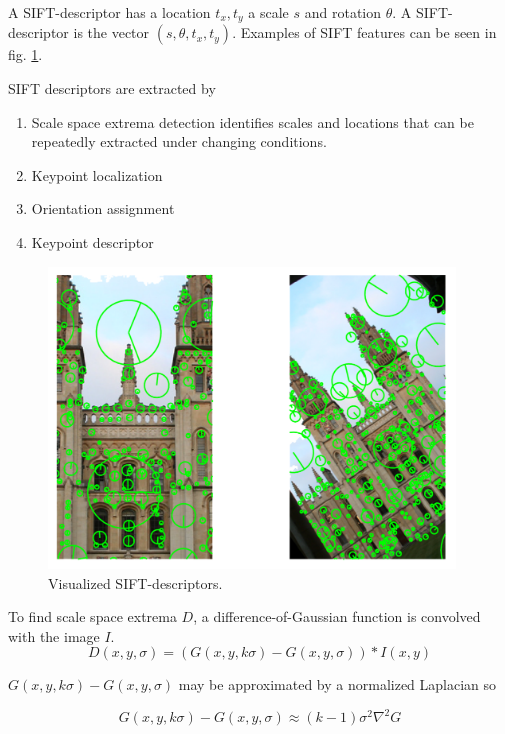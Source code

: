 \documentclass[english,12pt,a4paper,pdftex,elec,utf8]{aaltothesis}
\begin{document}
A SIFT-descriptor has a location $t_x, t_y$ a scale $s$ and rotation $\theta$. A SIFT-descriptor is the vector $(s, \theta, t_x, t_y)$. Examples of SIFT features can be seen in fig. \ref{siftfeatures}.

SIFT descriptors are extracted by

\begin{enumerate}
\item Scale space extrema detection identifies scales and locations that can be repeatedly extracted under changing conditions.
\item Keypoint localization
\item Orientation assignment
\item Keypoint descriptor
\end{enumerate}
\cite{Lowe2004}

\begin{figure}[htb]
\begin{center}
\includegraphics[height=8cm]{figures/siftDescriptor}
\end{center}
\caption{Visualized SIFT-descriptors.}
\label{siftfeatures}
\end{figure}

To find scale space extrema $D$, a difference-of-Gaussian function is convolved with the image $I$.
\begin{equation}\label{keypoints}
  D(x,y,\sigma) = (G(x,y,k\sigma) - G(x, y, \sigma))*I(x,y)
\end{equation}\cite{Lowe2004}

$G(x,y,k\sigma) - G(x, y, \sigma)$ may be approximated by a normalized Laplacian so

\begin{equation}\label{approximatedog}
G(x,y,k\sigma) - G(x, y, \sigma) \approx (k - 1)\sigma^{2}\nabla^{2}G
\end{equation}\cite{Lowe2004}
\end{document}
